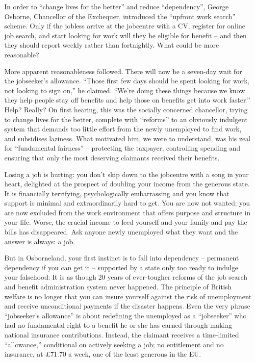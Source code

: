 In order to ``change lives for the better'' and reduce ``dependency'', George Osborne, Chancellor of the Exchequer, introduced the ``upfront work search'' scheme. Only if the jobless arrive at the jobcentre with a CV, register for online job search, and start looking for work will they be eligible for benefit – and then they should report weekly rather than fortnightly. What could be more reasonable?


More apparent reasonableness followed. There will now be a seven-day wait  for the jobseeker's allowance. ``Those first few days should be spent looking for work, not looking to sign on,'' he claimed. ``We're doing these things because we know they help people stay off benefits and help those on benefits get into work faster.'' Help? Really? On first hearing, this was the socially concerned chancellor, trying to change lives for the better, complete with ``reforms'' to an obviously indulgent system that demands too little effort from the newly unemployed to find work, and subsidises laziness. What motivated him, we were to understand, was his zeal for ``fundamental fairness'' – protecting the taxpayer, controlling spending and ensuring that only the most deserving claimants received their benefits.


Losing a job is hurting: you don't skip down to the jobcentre with a song in your heart, delighted at the prospect of doubling your income from the generous state. It is financially terrifying, psychologically embarrassing and you know that support is minimal and extraordinarily hard to get. You are now not wanted; you are now excluded from the work environment that offers purpose and structure in your life. Worse, the crucial income to feed yourself and your family and pay the bills has disappeared. Ask anyone newly unemployed what they want and the answer is always: a job.


But in Osborneland, your first instinct is to fall into dependency – permanent dependency if you can get it – supported by a state only too ready to indulge your falsehood. It is as though 20 years of ever-tougher reforms of the job search and benefit administration system never happened. The principle of British welfare is no longer that you can insure yourself against the risk of unemployment and receive unconditional payments if the disaster happens. Even the very phrase ``jobseeker's allowance'' is about redefining the unemployed as a ``jobseeker'' who had no fundamental right to a benefit he or she has earned through making national insurance contributions. Instead, the claimant receives a time-limited ``allowance,'' conditional on actively seeking a job; no entitlement and no insurance, at £71.70 a week, one of the least generous in the EU.